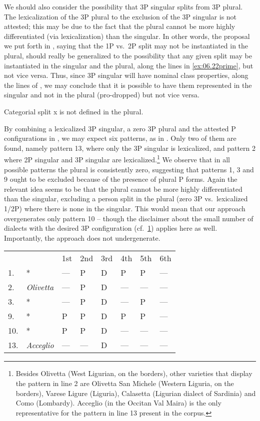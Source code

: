 \documentclass[output=paper]{langsci/langscibook}
\begin{document}
We should also consider the possibility that 3P singular splits from 3P plural.
The lexicalization of the 3P plural to the exclusion of the 3P singular is not
attested; this may be due to the fact that the plural cannot be more highly
differentiated (via lexicalization) than the singular. In other words, the
proposal we put forth in , saying that the 1P vs.\ 2P split may
not be instantiated in the plural, should really be generalized to the
possibility that any given split may be instantiated in the singular and the
plural, along the lines in \eqref{ex:06.22prime}, but not vice versa. Thus, since 3P singular
will have nominal class properties, along the lines of , we
may conclude that it is possible to have them represented in the singular and
not in the plural (pro-dropped) but not vice versa.

\ea\label{ex:06.22prime}
    Categorial split x is not defined in the plural.
\z

By combining a lexicalized 3P singular, a zero 3P plural and the attested P
configurations in , we may expect six patterns, as in
. Only two of them are found, namely pattern 13, where only the
3P singular is lexicalized, and pattern 2 where 2P singular and 3P singular are
lexicalized.\footnote{Besides Olivetta (West Ligurian, on the 
borders), other varieties that display the pattern in line 2 are Olivetta San
Michele (Western Liguria, on the  borders), Varese Ligure (Liguria),
Calasetta (Ligurian dialect of Sardinia) and Como (Lombardy).  Acceglio (in the
Occitan Val Maira) is the only representative for the pattern in line 13
present in the corpus.\label{fn:06.8}} We observe that in all possible
patterns the plural is consistently zero, suggesting that patterns 1, 3 and 9
ought to be excluded because of the presence of plural P forms. Again the
relevant idea seems to be that the plural cannot be more highly differentiated
than the singular, excluding a person split in the plural (zero 3P vs.\
lexicalized 1/2P) where there is none in the singular. This would mean that our
approach overgenerates only pattern 10 – though the disclaimer about the small
number of dialects with the desired 3P configuration (cf.\ \cref{fn:06.8})
applies here as well. Importantly, the approach does not undergenerate.

\ea\label{ex:06.25}
    \begin{tabular}[t]{llllllll}
    &                  & 1st & 2nd & 3rd & 4th & 5th & 6th \\
1.  & *                & --- & P   & D   & P   & P   & --- \\
2.  & \emph{Olivetta}  & --- & P   & D   & --- & --- & --- \\
3.  & *                & --- & P   & D   & --- & P   & --- \\
9.  & *                & P   & P   & D   & P   & P   & --- \\
10. & *                & P   & P   & D   & --- & --- & --- \\
13. & \emph{Acceglio}  & --- & --- & D   & --- & --- & --- \\
    \end{tabular}
\z
\end{document}
